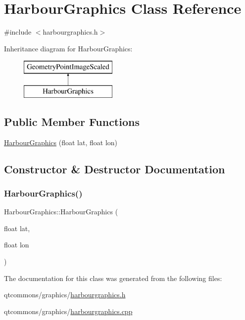 \hypertarget{class_harbour_graphics}{}\section{Harbour\+Graphics Class Reference}
\label{class_harbour_graphics}


{\ttfamily \#include $<$harbourgraphics.\+h$>$}

Inheritance diagram for Harbour\+Graphics\+:\begin{figure}[H]
\begin{center}
\leavevmode
\includegraphics[height=2.000000cm]{da/d73/class_harbour_graphics}
\end{center}
\end{figure}
\subsection*{Public Member Functions}
\begin{DoxyCompactItemize}
\item 
\mbox{\hyperlink{class_harbour_graphics_a453f9811e97a190235b2af3abc7f41c7}{Harbour\+Graphics}} (float lat, float lon)
\end{DoxyCompactItemize}


\subsection{Constructor \& Destructor Documentation}
\mbox{\label{class_harbour_graphics_a453f9811e97a190235b2af3abc7f41c7}} 
\subsubsection{\texorpdfstring{HarbourGraphics()}{HarbourGraphics()}}
{\footnotesize\ttfamily Harbour\+Graphics\+::\+Harbour\+Graphics (\begin{DoxyParamCaption}\item[{float}]{lat,  }\item[{float}]{lon }\end{DoxyParamCaption})}



The documentation for this class was generated from the following files\+:\begin{DoxyCompactItemize}
\item 
qtcommons/graphics/\mbox{\hyperlink{harbourgraphics_8h}{harbourgraphics.\+h}}\item 
qtcommons/graphics/\mbox{\hyperlink{harbourgraphics_8cpp}{harbourgraphics.\+cpp}}\end{DoxyCompactItemize}
